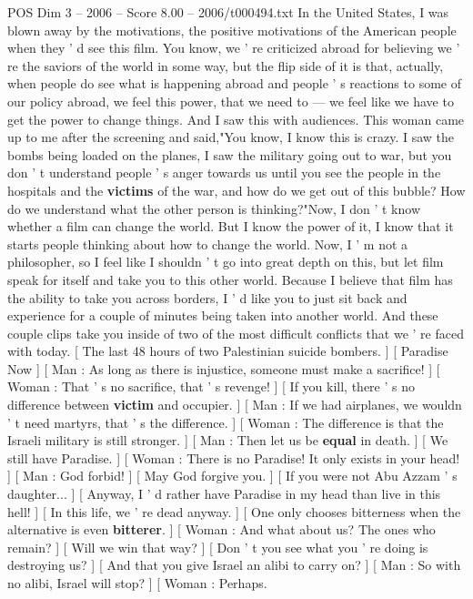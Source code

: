 \begin{textsample}{POS Dim 3 – 2006 – Score 8.00 – 2006/t000494.txt}
In the United States, I was blown away by the motivations, the positive motivations of the American people when they ' d see this film.
You know, we ' re criticized abroad for believing we ' re the saviors of the world in some way, but the flip side of it is that, actually, when people do see what is happening abroad and people ' s reactions to some of our policy abroad, we feel this power, that we need to — we feel like we have to get the power to change things.
And I saw this with audiences.
This woman came up to me after the screening and said,"You know, I know this is crazy.
I saw the bombs being loaded on the planes, I saw the military going out to war, but you don ' t understand people ' s anger towards us until you see the people in the hospitals and the \textbf{victims} of the war, and how do we get out of this bubble?
How do we understand what the other person is thinking?"Now, I don ' t know whether a film can change the world.
But I know the power of it, I know that it starts people thinking about how to change the world.
Now, I ' m not a philosopher, so I feel like I shouldn ' t go into great depth on this, but let film speak for itself and take you to this other world.
Because I believe that film has the ability to take you across borders, I ' d like you to just sit back and experience for a couple of minutes being taken into another world.
And these couple clips take you inside of two of the most difficult conflicts that we ' re faced with today. [ The last 48 hours of two Palestinian suicide bombers. ] [ Paradise Now ] [ Man : As long as there is injustice, someone must make a sacrifice! ] [ Woman : That ' s no sacrifice, that ' s revenge! ] [ If you kill, there ' s no difference between \textbf{victim} and occupier. ] [ Man : If we had airplanes, we wouldn ' t need martyrs, that ' s the difference. ] [ Woman : The difference is that the Israeli military is still stronger. ] [ Man : Then let us be \textbf{equal} in death. ] [ We still have Paradise. ] [ Woman : There is no Paradise!
It only exists in your head! ] [ Man : God forbid! ] [ May God forgive you. ] [ If you were not Abu Azzam ' s daughter... ] [ Anyway, I ' d rather have Paradise in my head than live in this hell! ] [ In this life, we ' re dead anyway. ] [ One only chooses bitterness when the alternative is even \textbf{bitterer}. ] [ Woman : And what about us?
The ones who remain? ] [ Will we win that way? ] [ Don ' t you see what you ' re doing is destroying us? ] [ And that you give Israel an alibi to carry on? ] [ Man : So with no alibi, Israel will stop? ] [ Woman : Perhaps.

\end{textsample}
